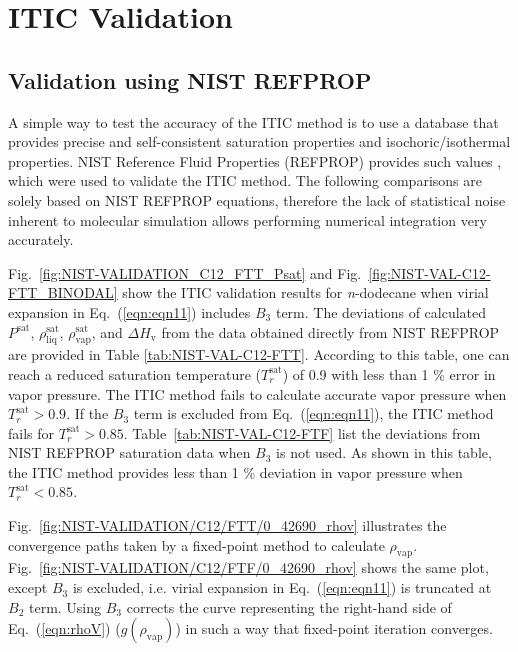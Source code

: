 \documentclass[%
 aip,
 jcp,
 sd,%
 amsmath,amssymb,
 reprint,%
]{revtex4-1}
\begin{document}
\section{ITIC Validation}
\subsection{Validation using NIST REFPROP} \label{sec:NIST-VAL}
A simple way to test the accuracy of the ITIC method is to use a database that provides precise and self-consistent saturation properties and isochoric/isothermal properties. NIST Reference Fluid Properties (REFPROP) provides such values \cite{LEMMON-RP91,Bucker2006,Lemmon2004,Wagner2002}, which were used to validate the ITIC method. The following comparisons are solely based on NIST REFPROP equations, therefore the lack of statistical noise inherent to molecular simulation allows performing numerical integration very accurately. 

Fig.~\ref{fig:NIST-VALIDATION_C12_FTT_Psat} and Fig.~\ref{fig:NIST-VAL-C12-FTT_BINODAL} show the ITIC validation results for \textit{n}-dodecane when virial expansion in Eq.~(\ref{eqn:eqn11}) includes $B_{3}$ term. The deviations of calculated $P^{\mathrm{sat}}$, $\rho_{\mathrm{liq}}^{\mathrm{sat}}$, $\rho_{\mathrm{vap}}^{\mathrm{sat}}$, and $\Delta H_{\mathrm{v}}$ from the data obtained directly from NIST REFPROP \cite{Lemmon2004} are provided in Table \ref{tab:NIST-VAL-C12-FTT}. According to this table, one can reach a reduced saturation temperature ($T_r^{\mathrm{sat}}$) of 0.9 with less than 1 \% error in vapor pressure. The ITIC method fails to calculate accurate vapor pressure when $T_r^{\mathrm{sat}}>0.9$. If the $B_3$ term is excluded from Eq.~(\ref{eqn:eqn11}), the ITIC method fails for $T_r^{\mathrm{sat}} > 0.85$. Table~\ref{tab:NIST-VAL-C12-FTF} list the deviations from NIST REFPROP saturation data when $B_3$ is not used. As shown in this table, the ITIC method provides less than 1 \% deviation in vapor pressure when $T_r^{\mathrm{sat}} < 0.85$.

Fig.~\ref{fig:NIST-VALIDATION/C12/FTT/0_42690_rhov} illustrates the convergence paths taken by a fixed-point method to calculate $\rho_{\mathrm{vap}}$. Fig.~\ref{fig:NIST-VALIDATION/C12/FTF/0_42690_rhov} shows the same plot, except $B_3$ is excluded, i.e. virial expansion in Eq.~(\ref{eqn:eqn11}) is truncated at $B_{2}$ term. Using $B_3$ corrects the curve representing the right-hand side of Eq.~(\ref{eqn:rhoV}) ($g(\rho_{\mathrm{vap}})$) in such a way that fixed-point iteration converges. 
\end{document}
